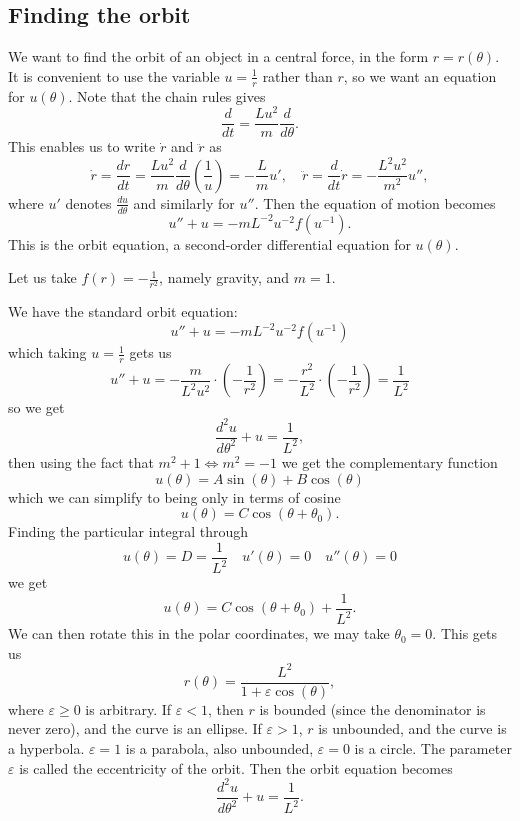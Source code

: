 \documentclass[10pt, a4paper]{article}
\begin{document}
\subsection{Finding the orbit}
We want to find the orbit of an object in a central force,
in the form $r = r(\theta)$.
It is convenient to use the variable $u = \frac{1}{r}$ rather than $r$,
so we want an equation for $u(\theta)$.
Note that the chain rules gives
\[
\frac{d}{dt} = \frac{Lu ^ 2}{m}\frac{d}{d\theta}.
\]
This enables us to write $\dot{r}$ and $\ddot{r}$ as
\[
\dot{r} = \frac{dr}{dt} = \frac{Lu ^ 2}{m}\frac{d}{d\theta}\left(\frac{1}{u}\right) = -\frac{L}{m}u',\quad \ddot{r} = \frac{d}{dt}\dot{r} = -\frac{L ^ 2u ^ 2}{m ^ 2}u'',
\]
where $u'$ denotes $\frac{du}{d\theta}$ and similarly for $u''$.
Then the equation of motion becomes
\[
u'' + u = -mL ^ {-2}u ^ {-2}f(u ^ {-1}).
\]
This is the orbit equation,
a second-order differential equation for $u(\theta)$.

\begin{example}
    Let us take $f(r) = -\frac{1}{r ^ 2}$,
    namely gravity,
    and $m = 1$.

    \begin{solution}
        We have the standard orbit equation:
        \[
        u'' + u = -mL ^ {-2}u ^ {-2}f(u ^ {-1})
        \]
        which taking $u = \frac{1}{r}$ gets us
        \[
        u'' + u = -\frac{m}{L ^ 2u ^ 2}\cdot\left(-\frac{1}{r ^ 2}\right) = -\frac{r ^ 2}{L ^ 2}\cdot\left(-\frac{1}{r ^ 2}\right) = \frac{1}{L ^ 2}
        \]
        so we get
        \[
        \frac{d ^ 2u}{d\theta ^ 2} + u = \frac{1}{L ^ 2},
        \]
        then using the fact that
        $m ^ 2 + 1 \iff m ^ 2 = -1$ we get the complementary function
        \[
        u(\theta) = A\sin(\theta) + B\cos(\theta)
        \]
        which we can simplify to being only in terms of cosine
        \[
        u(\theta) = C\cos(\theta + \theta_0).
        \]
        Finding the particular integral through
        \[
        u(\theta) = D = \frac{1}{L ^ 2}\quad u'(\theta) = 0\quad u''(\theta) = 0
        \]
        we get
        \[
        u(\theta) = C\cos(\theta + \theta_0) + \frac{1}{L ^ 2}.
        \]
        We can then rotate this in the polar coordinates,
        we may take $\theta_0 = 0$.
        This gets us
        \[
        r(\theta) = \frac{L ^ 2}{1 + \varepsilon\cos(\theta)},
        \]
        where $\varepsilon \geq 0$ is arbitrary.
        If $\varepsilon < 1$,
        then $r$ is bounded
        (since the denominator is never zero),
        and the curve is an ellipse.
        If $\varepsilon > 1$,
        $r$ is unbounded,
        and the curve is a hyperbola.
        $\varepsilon = 1$ is a parabola,
        also unbounded,
        $\varepsilon = 0$ is a circle.
        The parameter $\varepsilon$ is called the eccentricity of the orbit.
        Then the orbit equation becomes
        \[
        \frac{d ^ 2u}{d\theta ^ 2} + u = \frac{1}{L ^ 2}.
        \]
    \end{solution}
\end{example}
\end{document}
